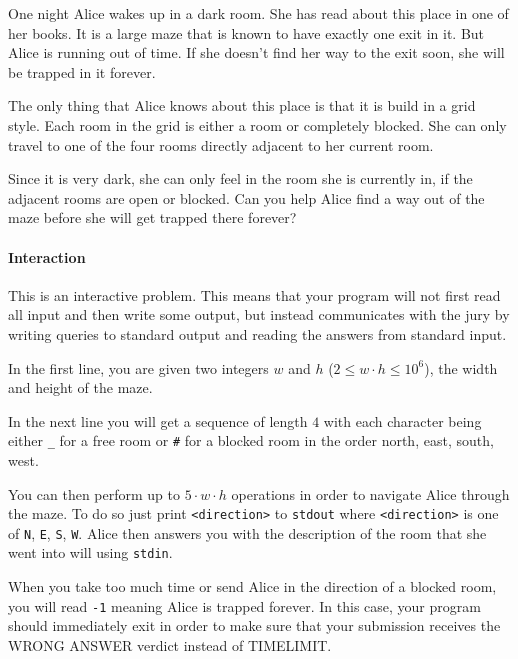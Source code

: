 



\makeheader

One night Alice wakes up in a dark room. She has read about this place in one of her books. It is a large maze that is known to have exactly one exit in it. But Alice is running out of time. If she doesn't find her way to the exit soon, she will be trapped in it forever.

The only thing that Alice knows about this place is that it is build in a grid style. Each room in the grid is either a room or completely blocked. She can only travel to one of the four rooms directly adjacent to her current room.

Since it is very dark, she can only feel in the room she is currently in, if the adjacent rooms are open or blocked. Can you help Alice find a way out of the maze before she will get trapped there forever?

\paragraph*{Interaction}

This is an interactive problem. This means that your program will not first read all input and then write some output, but instead communicates with the jury by writing queries to standard output and reading the answers from standard input.

In the first line, you are given two integers $w$ and $h$ ($2\leq w \cdot h \leq 10^6$), the width and height of the maze.

In the next line you will get a sequence of length $4$ with each character being either \texttt{\_} for a free room or \texttt{\#} for a blocked room in the order north, east, south, west.

You can then perform up to $5 \cdot w \cdot h$ operations in order to navigate Alice through the maze. To do so just print \texttt{<direction>} to \texttt{stdout} where \texttt{<direction>} is one of \texttt{N}, \texttt{E}, \texttt{S}, \texttt{W}. Alice then answers you with the description of the room that she went into will using \texttt{stdin}. 

When you take too much time or send Alice in the direction of a blocked room, you will read \texttt{-1} meaning Alice is trapped forever. In this case, your program should immediately exit in order to make sure that your submission receives the WRONG ANSWER verdict instead of TIMELIMIT.


